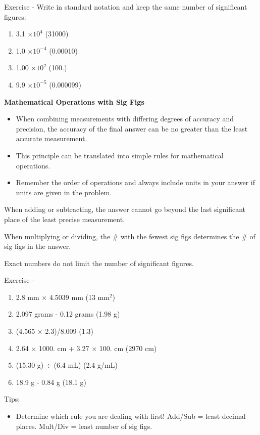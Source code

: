 \documentclass[../hchem.tex]{subfiles}
\begin{document}
Exercise - Write in standard notation and keep the same number of significant figures:
\begin{enumerate}
    \item 3.1 $\times 10^4$ (31000)
    \item 1.0 $\times 10^{-4}$ (0.00010)
    \item 1.00 $\times 10^2$ (100.)
    \item 9.9 $\times 10^{-5}$ (0.000099)
\end{enumerate}

\textbf{Mathematical Operations with Sig Figs}
\begin{itemize}
    \item When combining measurements with differing degrees of accuracy and precision, the 
    accuracy of the final answer can be no greater than the least accurate measurement.
    \item This principle can be translated into simple rules for mathematical operations.
    \item Remember the order of operations and always include units in your answer if units are given in the problem.
\end{itemize}

When adding or subtracting, the answer cannot go beyond the last significant place of the least precise measurement.

When multiplying or dividing, the \# with the fewest sig figs determines the \# of sig figs in the answer.

Exact numbers do not limit the number of significant figures.

Exercise - 
\begin{enumerate}
    \item 2.8 mm $\times$ 4.5039 mm (13 mm$^2$)
    \item 2.097 grams - 0.12 grams (1.98 g)
    \item (4.565 $\times$ 2.3)/8.009 (1.3)
    \item 2.64 $\times$ 1000. cm + 3.27 $\times$ 100. cm (2970 cm)
    \item (15.30 g) $\div$ (6.4 mL) (2.4 g/mL)
    \item 18.9 g - 0.84 g (18.1 g)
\end{enumerate}

Tips: 
\begin{itemize}
    \item Determine which rule you are dealing with first! Add/Sub = least decimal places. Mult/Div = least number of sig figs.
\end{itemize}
\end{document}
